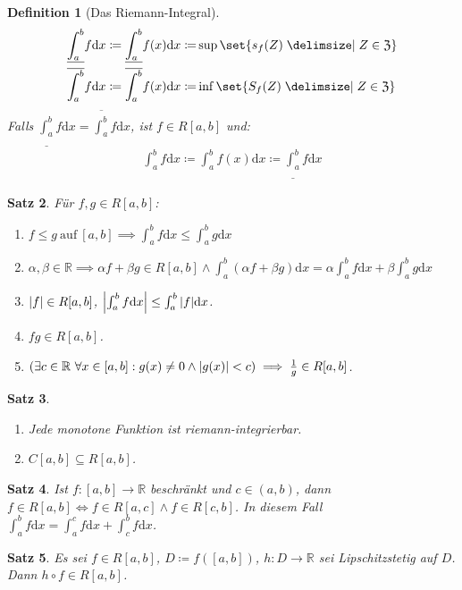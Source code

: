 \documentclass[a4paper]{article}
\newcounter{Sec}
\theoremstyle{marginbreak}
\newtheorem{definition}{Definition}[Sec]
\newtheorem{satz}[definition]{Satz}
\renewcommand{\d}[1]{\mathrm{d}#1}
\begin{document}
	\begin{definition}[Das Riemann-Integral]
		\begin{align*}
			\underline{\int_{a}^{b}}f\d{x}\coloneqq\underline{\int_{a}^{b}}f(x)\d{x}\coloneqq&\sup\set{s_f(Z)\given Z\in\mathfrak{Z}}\\
			\overline{\int_{a}^{b}}f\d{x}\coloneqq\overline{\int_{a}^{b}}f(x)\d{x}\coloneqq&\inf\set{S_f(Z)\given Z\in\mathfrak{Z}}
		\end{align*}
		Falls $\underline{\int_{a}^{b}}f\d{x}=\overline{\int_{a}^{b}}f\d{x}$, ist $f\in R[a,b]$ und:
		\begin{align*}
			\int_{a}^{b}f\d{x}\coloneqq\int_{a}^{b}f(x)\d{x}\coloneqq\underline{\int_{a}^{b}}f\d{x}
		\end{align*}
	\end{definition}
	\begin{satz}
		Für $f,g\in R[a,b]$:
		\begin{enumerate}[label=(\alph*)]
			\item $f\leq g~\text{auf}~[a,b]\implies\int_a^bf\d{x}\leq\int_a^bg\d{x}$
			\item $\alpha,\beta\in\mathbb{R}\implies\alpha f+\beta g\in R[a,b]\wedge
				\int_a^b(\alpha f+\beta g)\d{x}=\alpha\int_a^bf\d{x}+\beta\int_a^bg\d{x}$
			\item $\abs{f}\in R[a,b]$, $\abs{\int_a^bf\d{x}}\leq\int_a^b\abs{f}\d{x}$.
			\item $fg\in R[a,b]$.
			\item $(\exists c\in\mathbb{R}~\forall x\in[a,b]:g(x)\neq0\wedge\abs{g(x)}<c)\implies\frac{1}{g}\in R[a,b]$.
		\end{enumerate}
	\end{satz}
	\begin{satz}
		\begin{enumerate}[label=(\alph*)]
			\item Jede monotone Funktion ist riemann-integrierbar.
			\item $C[a,b]\subseteq R[a,b]$.
		\end{enumerate}
	\end{satz}
	\begin{satz}
		 Ist $f\colon [a,b]\to\mathbb{R}$ beschränkt und $c\in(a,b)$, dann
		 $f\in R[a,b]\iff f\in R[a,c]\wedge f\in R[c,b]$. In diesem Fall
		 $\int_a^bf\d{x}=\int_a^cf\d{x}+\int_c^bf\d{x}$.
	\end{satz}
	\begin{satz}
		Es sei $f\in R[a,b]$, $D\coloneqq f([a,b])$, $h\colon D\to\mathbb{R}$ sei
		Lipschitzstetig auf $D$. Dann $h\circ f\in R[a,b]$.
	\end{satz}
\end{document}

